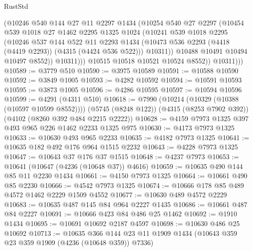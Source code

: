 \begin{lexlean}{RustStd}
\begin{coremodule}
                  (@10246
                    @540
                    @144
                    @27
                    @11
                    @2297
                    @1434
                    (@10254
                      @540
                      @27
                      @2297
                      (@10454
                        @539
                        @1018
                        @27
                        @1462
                        @2295
                        @1325
                        @1024
                        (@10241
                          @539
                          @1018
                          @2295
                          (@10246
                            @537
                            @144
                            @522
                            @11
                            @2293
                            @1434
                            (@10473 @536 @2293 (@4418 (@4419 @2293)) (@4315 (@4424 @536 @522)))
                            @10311))
                        @10488
                        @10491
                        @10494
                        @10497
                        @8552))
                    @10311)))
              @10515
              @10518
              @10521
              @10524
              @8552))
          @10311)))
@10589 := @3779 @510
@10590 := @3975 @10589
@10591 := @10588 @10590
@10592 := @3849 @1005
@10593 := @4282 @10592
@10594 := @10591 @10593
@10595 := @3873 @1005
@10596 := @4286 @10595
@10597 := @10594 @10596
@10599 := @4291 (@4311 @510)
@10618 := @7990
    (@10214 (@10329 (@10388 (@10597 @10599 @8552))))
    (@5745 (@8248 @122))
    (@4315 (@8253 @7902 @392))
    (@4102 (@8260 @392 @484 @2215 @2222))
@10628 := @4159 @7973 @1325 @397 @493 @965 @226 @1462 @2233 @1325 @975
@10630 := @4173 @7973 @1325
@10633 := @10630 @493 @965 @2233
@10635 := @4182 @7973 @1325
@10641 := @10635 @182 @492 @176 @964 @1515 @2232
@10643 := @4228 @7973 @1325
@10647 := @10643 @37 @176 @37 @1515
@10648 := @4237 @7973
@10653 := @10641 (@10647 (@4236 (@10648 @37)) @4616)
@10659 := @10635 @490 @144 @85 @11 @2230 @1434
@10661 := @4150 @7973 @1325
@10664 := @10661 @490 @85 @2230
@10666 := @4542 @7973 @1325
@10674 := @10666 @178 @85 @489 @4572 @1462 @2229 @1509 @4552
@10677 := @10630 @489 @4572 @2229
@10683 := @10635 @487 @145 @84 @964 @2227 @1435
@10686 := @10661 @487 @84 @2227
@10691 := @10666 @423 @84 @486 @25 @1462
@10692 := @1910 @1434
@10695 := @10691 @10692 @2187 @4597
@10698 := @10630 @486 @25 @10692
@10713 := @10635
    @366
    @144
    @23
    @11
    @1909
    @1434
    (@10643 @359 @23 @359 @1909 (@4236 (@10648 @359)) @7336)

\end{coremodule}
\end{lexlean}
